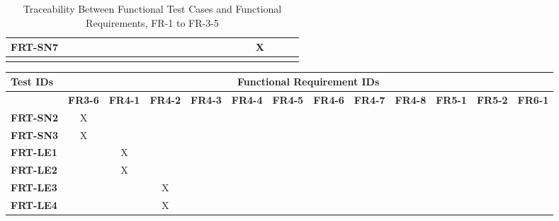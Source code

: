 \documentclass[12pt, titlepage]{article}
\begin{document}
\begin{landscape}
\begin{longtable}{|l|cccccccccccccccc|}
  \textbf{FRT-SN7}  & ~              & ~              & ~              & ~              & ~              & ~              & ~              & ~              & ~              & ~              & ~              & ~              & X              \\
  \hline
  \caption{Traceability Between Functional Test Cases and Functional Requirements, FR-1 to FR-3-5} \\
\end{longtable}

\newpage

\begin{longtable}{|l|cccccccccccc|}
  \hline
  \textbf{Test IDs} & \multicolumn{12}{c|}{\textbf{Functional Requirement IDs}} \\
  \hline
  ~                 & \textbf{FR3-6} & \textbf{FR4-1} & \textbf{FR4-2} & \textbf{FR4-3} & \textbf{FR4-4} & \textbf{FR4-5} & \textbf{FR4-6} & \textbf{FR4-7} & \textbf{FR4-8} &  \textbf{FR5-1} & \textbf{FR5-2} & \textbf{FR6-1} \\
  \hline
  \textbf{FRT-SN2}  & X              & ~              & ~              & ~              & ~              & ~              & ~              & ~              & ~              & ~              & ~               & ~              \\
  \textbf{FRT-SN3}  & X              & ~              & ~              & ~              & ~              & ~              & ~              & ~              & ~              & ~              & ~               & ~              \\
  \textbf{FRT-LE1}  & ~              & X              & ~              & ~              & ~              & ~              & ~              & ~              & ~              & ~              & ~               & ~              \\
  \textbf{FRT-LE2}  & ~              & X              & ~              & ~              & ~              & ~              & ~              & ~              & ~              & ~              & ~               & ~              \\
  \textbf{FRT-LE3}  & ~              & ~              & X              & ~              & ~              & ~              & ~              & ~              & ~              & ~              & ~               & ~              \\
  \textbf{FRT-LE4}  & ~              & ~              & X              & ~              & ~              & ~              & ~              & ~              & ~              & ~              & ~               & ~              \\

\end{longtable}
\end{landscape}
\end{document}
